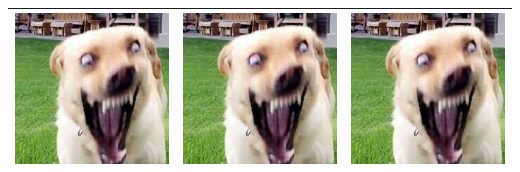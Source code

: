 \documentclass{article}
\begin{document}
\begin{center}
\begin{tabular}{c| c |c}
			\hline
			\includegraphics[scale=0.2]{Bild2} &
			\includegraphics[scale=0.15]{Bild2} &
			\includegraphics[angle= 100, origin = c,scale=0.07]{Bild2} \\
			\hline

\end{tabular}
\end{center}
\end{document}

